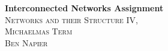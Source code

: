 



\begin{center}
  \textbf{Interconnected Networks Assignment} \\
  \textsc{Networks and their Structure IV, \\ Michaelmas Term} \\
  \textsc{Ben Napier}
  \vspace{1em}
\end{center}

\begin{questions}
  
  
  
  
  
\end{questions}
